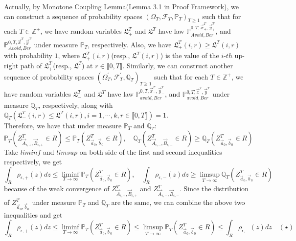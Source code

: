 \documentclass[12pt]{article}
\begin{document}
Actually, by Monotone Coupling Lemma(Lemma 3.1 in Proof Framework), we can construct a sequence of probability spaces $(\Omega_{T},\mathcal{F}_{T},\mathbb{P}_{T})_{T\geqslant 1}$ such that for each $T\in\mathbb{Z}^{+}$, we have random variables $\mathfrak{L}_{+}^{T}$ and $\mathfrak{L}^{T}$ have law $\mathbb{P}_{Avoid,Ber}^{0,T,\vec{x}^{T}_{+},\vec{y}^{T}_{+}}$, and $\mathbb{P}_{Avoid,Ber}^{0,T,\vec{x}^{T},\vec{y}^{T}}$ under measure $\mathbb{P}_{T}$, respectively. Also, we have $\mathfrak{L}_{+}^{T}(i,r)\geqslant \mathfrak{L}^{T}(i,r)$ with probability $1$, where $\mathfrak{L}_{+}^{T}(i,r)$(resp., $\mathfrak{L}^{T}(i,r)$) is the value of the $i$-$th$ up-right path of $\mathfrak{L}_{+}^{T}$(resp., $\mathfrak{L}^{T}$) at $r\in\llbracket 0,T\rrbracket$. Similarly, we can construct another sequence of probability spaces $(\Omega_{T}^{\prime},\mathcal{F}_{T}^{\prime},\mathbb{Q}_{T})_{T\geqslant 1}$ such that for each $T\in\mathbb{Z}^{+}$, we have random variables $\mathfrak{L}_{-}^{T}$ and $\mathfrak{L}^{T}$ have law $\mathbb{P}_{avoid,Ber}^{0,T,\vec{x}^{T}_{-},\vec{y}^{T}_{-}}$, and $\mathbb{P}_{avoid,Ber}^{0,T,\vec{x}^{T},\vec{y}^{T}}$ under measure $\mathbb{Q}_{T}$, respectively, along with $\mathbb{Q}_{T}(\mathfrak{L}_{-}^{T}(i,r)\leqslant \mathfrak{L}^{T}(i,r), i=1,\cdots, k, r\in\llbracket 0,T\rrbracket)=1$.\\
Therefore, we have that under measure $\mathbb{P}_{T}$ and $\mathbb{Q}_{T}$:
$$\mathbb{P}_{T}(Z^{T}_{\vec{A}_{\epsilon,+},\vec{B}_{\epsilon,+}}\in R)\leqslant \mathbb{P}_{T}(Z^{T}_{\vec{a}_{0},\vec{b}_{0}}\in R),\quad \mathbb{Q}_{T}(Z^{T}_{\vec{A}_{\epsilon,-},\vec{B}_{\epsilon,-}}\in R)\geqslant \mathbb{Q}_{T}(Z^{T}_{\vec{a}_{0},\vec{b}_{0}}\in R)$$
Take $liminf$ and $limsup$ on both side of the first and second inequalities respectively, we get
$$\int_{R}\rho_{\epsilon,+}(z)dz\leqslant \liminf_{T\rightarrow\infty}\mathbb{P}_{T}(Z^{T}_{\vec{a}_{0},\vec{b}_{0}}\in R),\quad \int_{R}\rho_{\epsilon,-}(z)dz\geqslant \limsup_{T\rightarrow\infty}\mathbb{Q}_{T}(Z^{T}_{\vec{a}_{0},\vec{b}_{0}}\in R)$$
because of the weak convergence of $Z^{T}_{\vec{A}_{\epsilon,+},\vec{B}_{\epsilon,+}}$ and $Z^{T}_{\vec{A}_{\epsilon,-},\vec{B}_{\epsilon,-}}$. Since the distribution of $Z^{T}_{\vec{a}_{0},\vec{b}_{0}}$ under measure $\mathbb{P}_{T}$ and $\mathbb{Q}_{T}$ are the same, we can combine the above two inequalities and get
$$\int_{R}\rho_{\epsilon,+}(z)dz\leqslant \liminf_{T\rightarrow\infty}\mathbb{P}_{T}(Z^{T}_{\vec{a}_{0},\vec{b}_{0}}\in R)\leqslant\limsup_{T\rightarrow\infty}\mathbb{P}_{T}(Z^{T}_{\vec{a}_{0},\vec{b}_{0}}\in R)\leqslant\int_{R}\rho_{\epsilon,-}(z)dz \quad (\star)$$
\end{document}
